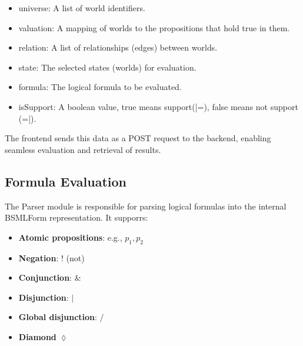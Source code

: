 \begin{itemize}
\item universe: A list of world identifiers.
\item valuation: A mapping of worlds to the propositions that hold true in them.
\item relation: A list of relationships (edges) between worlds.
\item state: The selected states (worlds) for evaluation.
\item formula: The logical formula to be evaluated.
\item isSupport: A boolean value, true means support(|=), false means not support (=|).
\end{itemize}

The frontend sends this data as a POST request to the backend, enabling seamless evaluation and retrieval of results. 


\subsection{Formula Evaluation}
The Parser module is responsible for parsing logical formulas into the internal BSMLForm representation. It supporrs:
\begin{itemize}
    \item \textbf{Atomic propositions}: e.g., \( p_1, p_2 \)
    \item \textbf{Negation}: \( ! \) (not)
    \item \textbf{Conjunction}: \( \& \)
    \item \textbf{Disjunction}: \( | \)
    \item \textbf{Global disjunction}: \( / \)
    \item \textbf{Diamond} \(\lozenge\)
\end{itemize}


